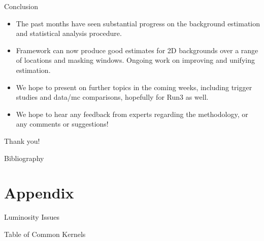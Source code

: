 \documentclass[10pt]{beamer}
\begin{document}
\begin{frame}{Conclusion}
  \begin{itemize}
  \item The past months have seen substantial progress on the background estimation and statistical analysis procedure.
  \item Framework can now produce good estimates for 2D backgrounds over a range of locations and masking windows. Ongoing work on improving and unifying estimation. 
  \item We hope to present on further topics in the coming weeks, including trigger studies and data/mc comparisons, hopefully for Run3 as well. 
  \item We hope to hear any feedback from experts regarding the methodology, or any comments or suggestions!
  \end{itemize}
  \vspace{1cm}

  \begin{center}
    {\Large Thank you!}
  \end{center}
\end{frame}


\begin{frame}{Bibliography}
  
  
\end{frame}


\appendix

\section{Appendix}
\label{sec:appendix}


\begin{frame}{Luminosity Issues}
  \relax
\end{frame}

\begin{frame}{Table of Common Kernels}
  \begin{center}
  \end{center}
\end{frame}
\end{document}
